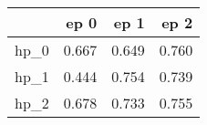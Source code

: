 \begin{tabular}{lrrr}
\toprule
{} &   ep 0 &   ep 1 &   ep 2 \\
\midrule
hp\_0 &  0.667 &  0.649 &  0.760 \\
hp\_1 &  0.444 &  0.754 &  0.739 \\
hp\_2 &  0.678 &  0.733 &  0.755 \\
\bottomrule
\end{tabular}

